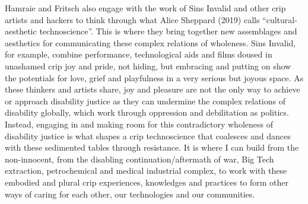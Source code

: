 Hamraie and Fritsch also engage with the work of Sins Invalid and other
crip artists and hackers to think through what Alice Sheppard (2019)
calls ``cultural-aesthetic technoscience''. This is where they bring
together new assemblages and aesthetics for communicating these complex
relations of wholeness. Sins Invalid, for example, combine performance,
technological aids and films doused in unashamed crip joy and pride, not
hiding, but embracing and putting on show the potentials for love, grief
and playfulness in a very serious but joyous space. As these thinkers
and artists share, joy and pleasure are not the only way to achieve or
approach disability justice as they can undermine the complex relations
of disability globally, which work through oppression and debilitation
as politics. Instead, engaging in and making room for this contradictory
wholeness of disability justice is what shapes a crip technoscience that
coalesces and dances with these sedimented tables through resistance. It
is where I can build from the non-innocent, from the disabling
continuation/aftermath of war, Big Tech extraction, petrochemical and
medical industrial complex, to work with these embodied and plural crip
experiences, knowledges and practices to form other ways of caring for
each other, our technologies and our communities.

